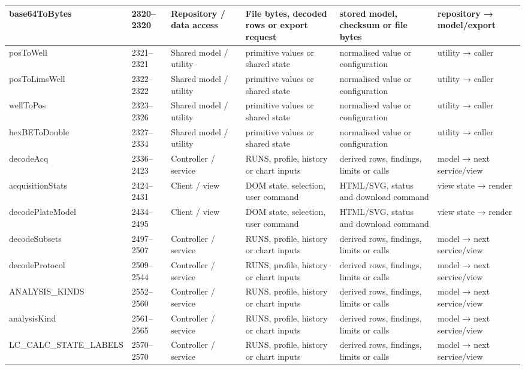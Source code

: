 \begin{landscape}
\begin{longtable}{@{}p{3.2cm}p{1.45cm}p{2.7cm}p{4.0cm}p{4.0cm}p{3.0cm}@{}}
base64ToBytes & 2320--2320 & Repository / data access & File bytes, decoded rows or export request & stored model, checksum or file bytes & repository → model/export \\\hline
posToWell & 2321--2321 & Shared model / utility & primitive values or shared state & normalised value or configuration & utility → caller \\\hline
posToLimsWell & 2322--2322 & Shared model / utility & primitive values or shared state & normalised value or configuration & utility → caller \\\hline
wellToPos & 2323--2326 & Shared model / utility & primitive values or shared state & normalised value or configuration & utility → caller \\\hline
hexBEToDouble & 2327--2334 & Shared model / utility & primitive values or shared state & normalised value or configuration & utility → caller \\\hline
decodeAcq & 2336--2423 & Controller / service & RUNS, profile, history or chart inputs & derived rows, findings, limits or calls & model → next service/view \\\hline
acquisitionStats & 2424--2431 & Client / view & DOM state, selection, user command & HTML/SVG, status and download command & view state → render \\\hline
decodePlateModel & 2434--2495 & Client / view & DOM state, selection, user command & HTML/SVG, status and download command & view state → render \\\hline
decodeSubsets & 2497--2507 & Controller / service & RUNS, profile, history or chart inputs & derived rows, findings, limits or calls & model → next service/view \\\hline
decodeProtocol & 2509--2544 & Controller / service & RUNS, profile, history or chart inputs & derived rows, findings, limits or calls & model → next service/view \\\hline
ANALYSIS\_KINDS & 2552--2560 & Controller / service & RUNS, profile, history or chart inputs & derived rows, findings, limits or calls & model → next service/view \\\hline
analysisKind & 2561--2565 & Controller / service & RUNS, profile, history or chart inputs & derived rows, findings, limits or calls & model → next service/view \\\hline
LC\_CALC\_STATE\_LABELS & 2570--2570 & Controller / service & RUNS, profile, history or chart inputs & derived rows, findings, limits or calls & model → next service/view \\\hline

\end{longtable}
\end{landscape}
